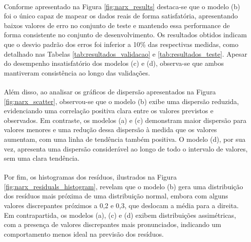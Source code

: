 \paragraph{} Conforme apresentado na Figura \ref{fig:narx_results} destaca-se que o modelo (b) foi o único capaz de mapear os dados reais de forma satisfatória, apresentando baixos valores de erro no conjunto de teste e mantendo essa performance de forma consistente no conjunto de desenvolvimento. Os resultados obtidos indicam que o desvio padrão dos erros foi inferior a 10\% das respectivas medidas, como detalhado nas Tabelas \ref{tab:resultados_validacao} e \ref{tab:resultados_teste}. Apesar do desempenho insatisfatório dos modelos (c) e (d), observa-se que ambos mantiveram consistência ao longo das validações.
\paragraph{} Além disso, ao analisar os gráficos de dispersão apresentados na Figura \ref{fig:narx_scatter}, observou-se que o modelo (b) exibe uma dispersão reduzida, evidenciando uma correlação positiva clara entre os valores previstos e observados. Em contraste, os modelos (a) e (c) demonstram maior dispersão para valores menores e uma redução dessa dispersão à medida que os valores aumentam, com uma linha de tendência também positiva. O modelo (d), por sua vez, apresenta uma dispersão considerável ao longo de todo o intervalo de valores, sem uma clara tendência.
\paragraph{} Por fim, os histogramas dos resíduos, ilustrados na Figura \ref{fig:narx_residuals_histogram}, revelam que o modelo (b) gera uma distribuição dos resíduos mais próxima de uma distribuição normal, embora com alguns valores discrepantes próximos a 0,2 e 0,3, que deslocam a média para a direita. Em contrapartida, os modelos (a), (c) e (d) exibem distribuições assimétricas, com a presença de valores discrepantes mais pronunciados, indicando um comportamento menos ideal na previsão dos resíduos.

